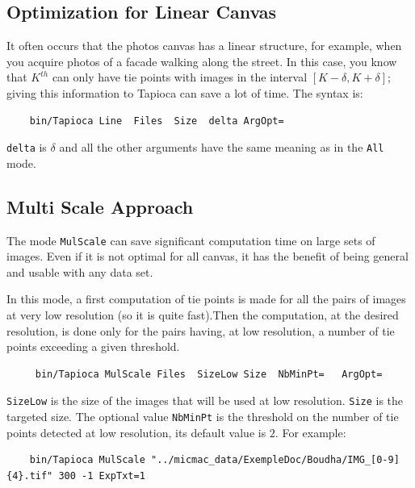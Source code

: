 
\subsection{Optimization for Linear Canvas}

It often occurs that the photos canvas  has a linear structure, for example, when you acquire
photos of a facade walking  along the street.   In this case, you
know that $K^{th}$  can only have tie points
with images in the interval $[K-\delta,K+\delta]$; giving this information
to Tapioca can save a lot of time. The syntax is:

{\scriptsize
\begin{verbatim}
    bin/Tapioca Line  Files  Size  delta ArgOpt=
\end{verbatim}
}

{\tt delta} is $\delta$ and all the other arguments have the same meaning as in the
 {\tt All} mode.


\subsection{Multi Scale Approach}


The mode  {\tt MulScale} can save  significant computation time on large sets of images.
Even if it is not optimal for all canvas, it has the benefit of being general
and usable with any data set.

In this mode, a first computation of tie points is made for all the pairs
of images at very low resolution (so it is quite fast).Then the
computation, at the desired resolution, is done  only for the pairs
having, at low resolution, a number  of tie points exceeding a given
threshold.



{\scriptsize
\begin{verbatim}
     bin/Tapioca MulScale Files  SizeLow Size  NbMinPt=   ArgOpt=
\end{verbatim}
}

{\tt SizeLow} is the size of the images that will be used at low resolution.
{\tt Size} is the targeted size.  The optional value {\tt NbMinPt}
is the threshold on the number of tie points detected at low resolution,
its default value is $2$. For example:

{\scriptsize
\begin{verbatim}
    bin/Tapioca MulScale "../micmac_data/ExempleDoc/Boudha/IMG_[0-9]{4}.tif" 300 -1 ExpTxt=1
\end{verbatim}
}

